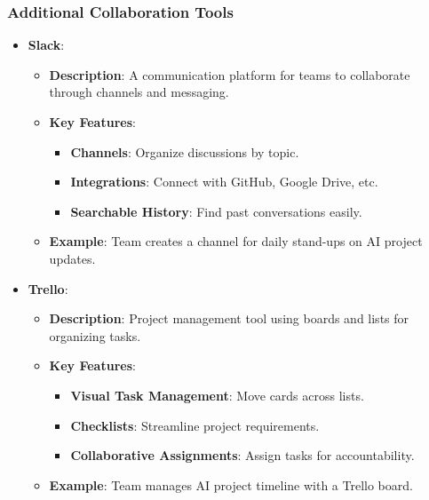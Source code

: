 \documentclass{beamer}
\begin{document}
\begin{frame}[fragile]
    \frametitle{Additional Collaboration Tools}
    \begin{itemize}
        \item \textbf{Slack}:
            \begin{itemize}
                \item \textbf{Description}: A communication platform for teams to collaborate through channels and messaging.
                \item \textbf{Key Features}:
                    \begin{itemize}
                        \item \textbf{Channels}: Organize discussions by topic.
                        \item \textbf{Integrations}: Connect with GitHub, Google Drive, etc.
                        \item \textbf{Searchable History}: Find past conversations easily.
                    \end{itemize}
                \item \textbf{Example}: Team creates a channel for daily stand-ups on AI project updates.
            \end{itemize}
        \item \textbf{Trello}:
            \begin{itemize}
                \item \textbf{Description}: Project management tool using boards and lists for organizing tasks.
                \item \textbf{Key Features}:
                    \begin{itemize}
                        \item \textbf{Visual Task Management}: Move cards across lists.
                        \item \textbf{Checklists}: Streamline project requirements.
                        \item \textbf{Collaborative Assignments}: Assign tasks for accountability.
                    \end{itemize}
                \item \textbf{Example}: Team manages AI project timeline with a Trello board.
            \end{itemize}
    \end{itemize}
\end{frame}
\end{document}
